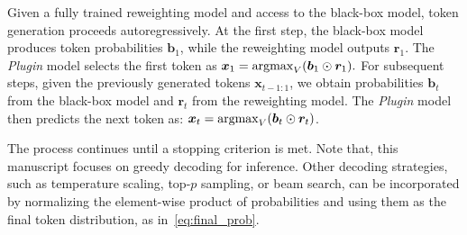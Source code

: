 
Given a fully trained reweighting model and access to the black-box model, token generation proceeds autoregressively. At the first step, the black-box model produces token probabilities $\bm{b}_1$, while the reweighting model outputs $\bm{r}_1$. The \textit{Plugin} model selects the first token as $\bm{x}_1 = \operatorname*{argmax}_{V} (\bm{b}_1 \odot \bm{r}_1).$ For subsequent steps, given the previously generated tokens $\bm{x}_{t-1:1}$, we obtain probabilities $\bm{b}_t$ from the black-box model and $\bm{r}_t$ from the reweighting model. The \textit{Plugin} model then predicts the next token as: $\bm{x}_t = \operatorname*{argmax}_{V} (\bm{b}_t \odot \bm{r}_t)$.

The process continues until a stopping criterion is met. Note that, this manuscript focuses on greedy decoding for inference. Other decoding strategies, such as temperature scaling, top-$p$ sampling, or beam search, can be incorporated by normalizing the element-wise product of probabilities and using them as the final token distribution, as in~\eqref{eq:final_prob}.